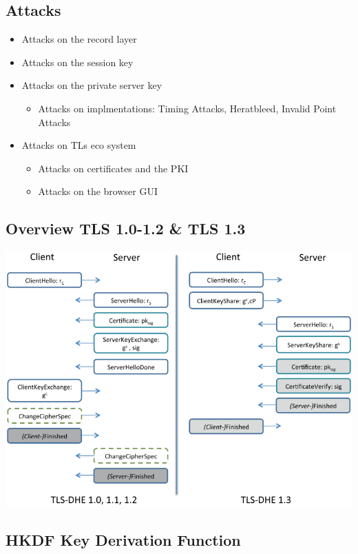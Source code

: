 \subsection{Attacks}
\begin{itemize}
  \item Attacks on the record layer
  \item Attacks on the session key
  \item Attacks on the private server key
    \begin{itemize}
      \item Attacks on implmentations: Timing Attacks, Heratbleed, Invalid Point Attacks
    \end{itemize}
  \item Attacks on TLs eco system
    \begin{itemize}
      \item Attacks on certificates and the PKI
      \item Attacks on the browser GUI
    \end{itemize}
\end{itemize}

\subsection{Overview TLS 1.0-1.2 \& TLS 1.3}
\includegraphics[width=0.8\columnwidth]{Resources/tls.png}

\subsection{HKDF Key Derivation Function}

